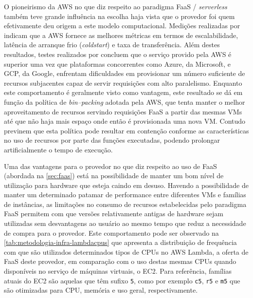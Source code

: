 \documentclass[english,brazilian]{UNISINOSmonografia} %
\begin{document}
O pioneirismo da AWS no que diz respeito ao paradigma FaaS / \textit{serverless} também teve grande influência na escolha haja vista que o provedor foi quem efetivamente deu origem a este modelo computacional.
Medições realizadas por  indicam que a AWS fornece as melhores métricas em termos de escalabilidade, latência de arranque frio (\textit{coldstart}) e taxa de transferência.
Além destes resultados, testes realizados por  concluem que o serviço provido pela AWS é superior uma vez que plataformas concorrentes como Azure, da Microsoft, e GCP, da Google, enfrentam dificuldades em provisionar um número suficiente de recursos subjacentes capaz de servir requisições com alto paralelismo.
Enquanto este comportamento é geralmente visto como vantagem, este resultado se dá em função da política de \textit{bin--packing} adotada pela AWS, que tenta manter o melhor aproveitamento de recursos servindo requisições FaaS a partir das mesmas VMs até que não haja mais espaço onde então é provisionada uma nova VM.
Contudo  previnem que esta política pode resultar em contenção conforme as características no uso de recursos por parte das funções executadas, podendo prolongar artificialmente o tempo de execução.


Uma das vantagens para o provedor no que diz respeito ao uso de FaaS (abordada na \autoref{sec:faas}) está na possibilidade de manter um bom nível de utilização para hardware que esteja caindo em desuso.
Havendo a possibilidade de manter um determinado patamar de performance entre diferentes VMs e famílias de instâncias, as limitações no consumo de recursos estabelecidas pelo paradigma FaaS permitem com que versões relativamente antigas de hardware sejam utilizadas sem desvantagens ao usuário ao mesmo tempo que reduz a necessidade de compra para o provedor.
Este comportamento pode ser observado na \autoref{tab:metodologia-infra-lambdacpus} que apresenta a distribuição de frequência com que são utilizados determinados tipos de CPUs no AWS Lambda, a oferta de FaaS deste provedor, em comparação com o uso destas mesmas CPUs quando disponíveis no serviço de máquinas virtuais, o EC2.
Para referência, famílias atuais do EC2 são aquelas que têm sufixo \texttt{5}, como por exemplo \texttt{c5}, \texttt{r5} e \texttt{m5} que são otimizadas para CPU, memória e uso geral, respectivamente.
\end{document}
